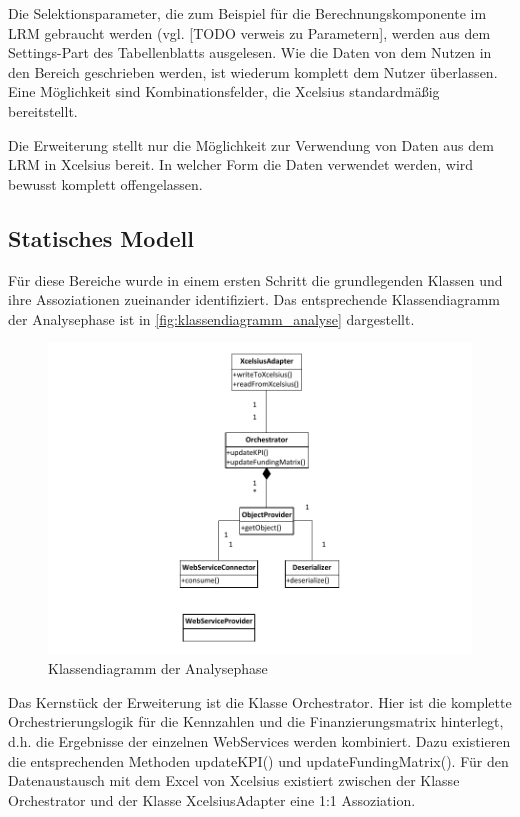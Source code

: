 Die Selektionsparameter, die zum Beispiel für die Berechnungskomponente im LRM gebraucht werden (vgl. [TODO verweis zu Parametern], werden aus dem Settings-Part des Tabellenblatts ausgelesen. Wie die Daten von dem Nutzen in den Bereich geschrieben werden, ist wiederum komplett dem Nutzer überlassen. Eine Möglichkeit sind Kombinationsfelder, die Xcelsius standardmäßig bereitstellt.

Die Erweiterung stellt nur die Möglichkeit zur Verwendung von Daten aus dem LRM in Xcelsius bereit. In welcher Form die Daten verwendet werden, wird bewusst komplett offengelassen.

\subsection{Statisches Modell}
Für diese Bereiche wurde in einem ersten Schritt die grundlegenden Klassen und ihre Assoziationen zueinander identifiziert. Das entsprechende Klassendiagramm der Analysephase ist in \vref{fig:klassendiagramm_analyse} dargestellt.

\begin{figure}[h]
\centering
\setlength{\unitlength}{1mm}
\includegraphics[width=15cm]{Visio/Analyse.pdf}
\caption{Klassendiagramm der Analysephase\label{fig:klassendiagramm_analyse}}
\end{figure}

Das Kernstück der Erweiterung ist die Klasse Orchestrator. Hier ist die komplette Orchestrierungslogik für die Kennzahlen und die Finanzierungsmatrix hinterlegt, d.h. die Ergebnisse der einzelnen WebServices werden kombiniert. Dazu existieren die entsprechenden Methoden updateKPI() und updateFundingMatrix(). Für den Datenaustausch mit dem Excel von Xcelsius existiert zwischen der Klasse Orchestrator und der Klasse XcelsiusAdapter eine 1:1 Assoziation.

